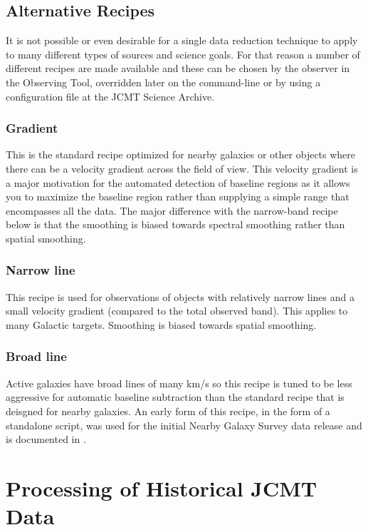 \documentclass[final,authoryear,5p,times,twocolumn]{elsarticle}
\begin{document}
\subsection{Alternative Recipes}

It is not possible or even desirable for a single data reduction
technique to apply to many different types of sources and science
goals. For that reason a number of different recipes are made
available and these can be chosen by the observer in the Observing
Tool, overridden later on the command-line or by using a
configuration file at the JCMT Science Archive.

\subsubsection{Gradient}

This is the standard recipe optimized for nearby galaxies or other 
objects where there can be a velocity gradient across
the field of view. This velocity gradient is a major motivation for the
automated detection of baseline regions as it allows you to maximize
the baseline region rather than supplying a simple range that
encompasses all the data. The major difference with the narrow-band
recipe below is that the smoothing is biased towards spectral smoothing
rather than spatial smoothing. 

\subsubsection{Narrow line}

This recipe is used for observations of objects with relatively narrow
lines and a small velocity gradient (compared to the total observed
band). This applies to many Galactic targets. Smoothing is biased
towards spatial smoothing.

\subsubsection{Broad line}

Active galaxies have broad lines of many km/s so this recipe is tuned
to be less aggressive for automatic baseline subtraction than the
standard recipe that is deisgned for nearby galaxies. An early
form of this recipe, in the form of a standalone script, was used for
the initial Nearby Galaxy Survey data release and is documented in
\citet{2010ApJ...714..571W}.

\section{Processing of Historical JCMT Data}
\end{document}
